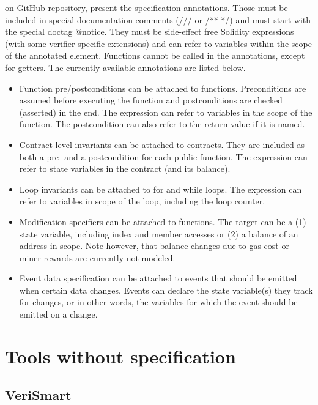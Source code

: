 \citet{SolcVerify_3} on GitHub repository, present the specification annotations. Those must be included in special documentation comments (/// or /** */) and must start with the special doctag @notice. 
They must be side-effect free Solidity expressions (with some verifier specific extensions) and can refer to variables within the scope of the annotated element. Functions cannot be called in the annotations, except for getters.
The currently available annotations are listed below. 

\begin{itemize}
    \item Function pre/postconditions can be attached to functions. Preconditions are assumed before executing the function and postconditions are checked (asserted) in the end. The expression can refer to variables in the scope of the function. The postcondition can also refer to the return value if it is named.
    \item Contract level invariants can be attached to contracts. They are included as both a pre- and a postcondition for each public function. The expression can refer to state variables in the contract (and its balance).
    \item Loop invariants can be attached to for and while loops. The expression can refer to variables in scope of the loop, including the loop counter.
    \item Modification specifiers can be attached to functions. The target can be a (1) state variable, including index and member accesses or (2) a balance of an address in scope. Note however, that balance changes due to gas cost or miner rewards are currently not modeled.
    \item Event data specification can be attached to events that should be emitted when certain data changes. 
    Events can declare the state variable(s) they track for changes, or in other words, the variables for which the event should be emitted on a change.
\end{itemize}

\section{Tools without specification}
\label{sec:Tools:WithoutSpecification}

\subsection{VeriSmart}
\label{sec:WithoutSpecification:VeriSmart}

